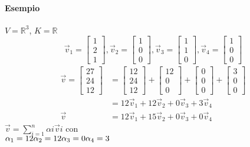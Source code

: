 \paragraph{Esempio} $V=\mathbb{R}^3$, $K=\mathbb{R}$\\
\[
    \vec{v}_1= 
    \begin{bmatrix}
        1\\2\\1
    \end{bmatrix}, 
    \vec{v}_2= 
    \begin{bmatrix}
        1\\0\\0
    \end{bmatrix}, 
    \vec{v}_3= 
    \begin{bmatrix}
        1\\1\\0
    \end{bmatrix}, 
    \vec{v}_4= 
    \begin{bmatrix}
        1\\0\\0
    \end{bmatrix}
\]
\begin{align*}
    \vec{v}= 
    \begin{bmatrix}
        27\\24\\12
    \end{bmatrix}
    &
    =
    \begin{bmatrix}
        12\\24\\12
    \end{bmatrix}
    +
    \begin{bmatrix}
        12\\0\\0
    \end{bmatrix}
    +
    \begin{bmatrix}
        0\\0\\0
    \end{bmatrix}
    +
    \begin{bmatrix}
        3\\0\\0
    \end{bmatrix}\\
    &= 
    12\vec{v}_1 + 12\vec{v}_2+0\vec{v}_3+3\vec{v}_4\\
    \vec{v} & = 12\vec{v}_1 + 15\vec{v}_2 + 0\vec{v}_3+ 0\vec{v}_4
\end{align*}
$\vec{v}=\sum_{i=1}^{n}\alpha i\vec{v}i$ con\\
$
    \alpha_1=12\\
    \alpha_2=12\\
    \alpha_3=0\\
    \alpha_4=3
$\\

